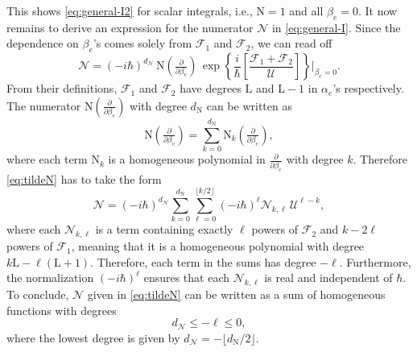 \documentclass[12pt]{article}
\numberwithin{figure}{section}
\def \be {\begin{equation}}
\def \ee {\end{equation}}
\def \L {\mathrm{L}}
\def \U {\mathcal{U}}
\def \F {\mathcal{F}}
\def \leq {\leqslant}
\def \N {\mathcal{N}}
\def \NN {\mathrm{N}}
\begin{document}
This shows \eqref{eq:general-I2} for scalar integrals, i.e., $\mathrm{N}=1$ and all $\beta_e = 0$. 
It now remains to derive an expression for the numerator $\N$ in \eqref{eq:general-I}. Since the dependence on $\beta_e$'s comes solely from $\F_1$ and $\F_2$, we can read off
%
\be\label{eq:tildeN}
\boxed{\N = (-i\hbar)^{d_\N}\, \NN(\tfrac{\partial}{\partial \beta_{e}})\, \exp \left\{ \frac{i}{\hbar} \left[ \frac{\F_1 + \F_2 }{\U} \right] \right\} \Bigg|_{\beta_e = 0}.}
\ee
%
From their definitions, $\F_1$ and $\F_2$ have degrees $\L$ and $\L{-}1$ in $\alpha_e$'s respectively. The numerator $\NN(\tfrac{\partial}{\partial \beta_{e}})$ with degree $d_\NN$ can be written as
%
\be
\NN(\tfrac{\partial}{\partial \beta_{e}}) = \sum_{k=0}^{d_\NN} \NN_k(\tfrac{\partial}{\partial \beta_{e}}),
\ee
%
where each term $\NN_k$ is a homogeneous polynomial in $\tfrac{\partial}{\partial \beta_{e}}$ with degree $k$.
Therefore \eqref{eq:tildeN} has to take the form
%
\be
\N = (-i\hbar)^{d_{\N}} \sum_{k=0}^{d_\NN} \sum_{\ell=0}^{\lfloor k/2 \rfloor} (-i\hbar)^\ell \N_{k,\ell}\, \U^{\ell - k},
\ee
%
where each $\N_{k,\ell}$ is a term containing exactly $\ell$ powers of $\F_2$ and $k {-} 2\ell$ powers of $\F_1$, meaning that it is a homogeneous polynomial with degree $k \L - \ell(\L{+}1)$. Therefore, each term in the sums has degree $-\ell$.
Furthermore, the normalization $(-i\hbar)^\ell$ ensures that each $\N_{k,\ell}$ is real and independent of $\hbar$. To conclude, $\N$ given in \eqref{eq:tildeN} can be written as a sum of homogeneous functions with degrees
%
\be
d_{\N} \leq - \ell \leq 0,
\ee
%
where the lowest degree is given by $d_\N = - \lfloor d_\NN / 2 \rfloor$.
\end{document}
